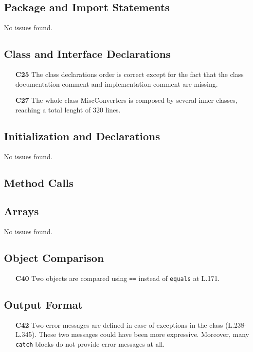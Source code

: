 \subsection{Package and Import Statements}
No issues found.

\subsection{Class and Interface Declarations}
	\begin{itemize}
		\item[\textbf{C25}] The class declarations order is correct except for the fact that the class documentation comment and implementation comment are missing.
		\item[\textbf{C27}] The whole class MiscConverters is composed by several inner classes, reaching a total lenght of 320 lines.
	\end{itemize}

\subsection{Initialization and Declarations}
No issues found.

\subsection{Method Calls}
\blindtext

\subsection{Arrays}
No issues found.

\subsection{Object Comparison}
	\begin{itemize}
		\item[\textbf{C40}] Two objects are compared using \texttt{==} instead of \texttt{equals} at L.171.
	\end{itemize}

\subsection{Output Format}
	\begin{itemize}
		\item[\textbf{C42}] Two error messages are defined in case of exceptions in the class (L.238-L.345). These two messages could have been more expressive. Moreover, many \texttt{catch} blocks do not provide error messages at all.
	\end{itemize}

